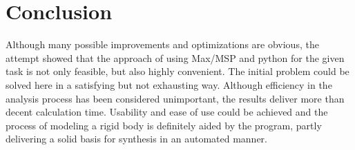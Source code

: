 \chapter{Conclusion}
\label{conclusion}
Although many possible improvements and optimizations are obvious, the attempt showed that the approach of using Max/MSP and python for the given task is not only feasible, but also highly convenient. The initial problem could be solved here in a satisfying but not exhausting way. Although efficiency in the analysis process has been considered unimportant, the results deliver more than decent calculation time. Usability and ease of use could be achieved and the process of modeling a rigid body is definitely aided by the program, partly delivering a solid basis for synthesis in an automated manner.  